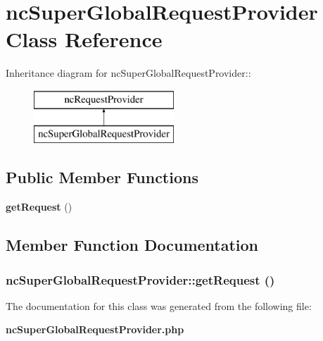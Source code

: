 \section{ncSuperGlobalRequestProvider Class Reference}
\label{classncSuperGlobalRequestProvider}
Inheritance diagram for ncSuperGlobalRequestProvider::\begin{figure}[H]
\begin{center}
\leavevmode
\includegraphics[height=2cm]{classncSuperGlobalRequestProvider}
\end{center}
\end{figure}
\subsection*{Public Member Functions}
\begin{CompactItemize}
\item 
{\bf getRequest} ()
\end{CompactItemize}


\subsection{Member Function Documentation}
\subsubsection{\setlength{\rightskip}{0pt plus 5cm}ncSuperGlobalRequestProvider::getRequest ()}\label{classncSuperGlobalRequestProvider_ee1074c3b0bc1c37f58bbd80bfaa3d06}




The documentation for this class was generated from the following file:\begin{CompactItemize}
\item 
{\bf ncSuperGlobalRequestProvider.php}\end{CompactItemize}
